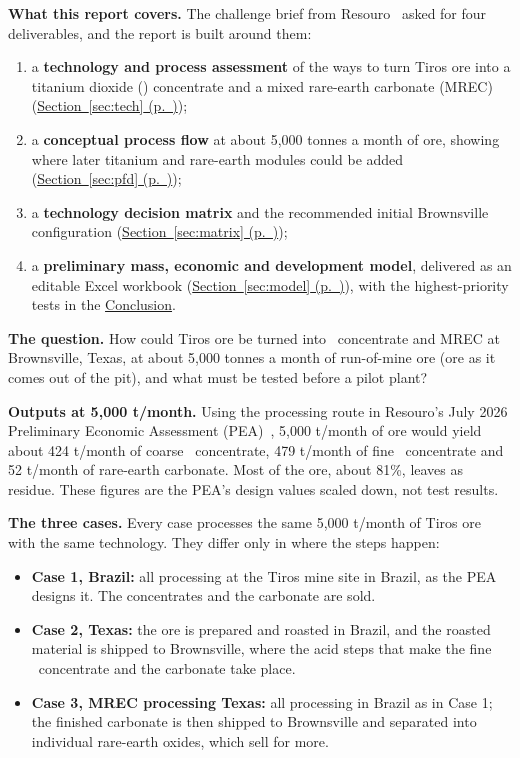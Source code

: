 \documentclass[11pt,letterpaper]{article}
\newcommand{\tio}{\ce{TiO2}}
\newcommand{\sref}[1]{\hyperref[#1]{Section~\ref*{#1} (p.~\pageref*{#1})}}
\begin{document}
\textbf{What this report covers.} The challenge brief from Resouro~\cite{brief} asked for four deliverables, and the report is built around them:
\begin{enumerate}[itemsep=0pt]
\item a \textbf{technology and process assessment} of the ways to turn Tiros ore into a titanium dioxide (\tio) concentrate and a mixed rare-earth carbonate (MREC) (\sref{sec:tech});
\item a \textbf{conceptual process flow} at about 5,000 tonnes a month of ore, showing where later titanium and rare-earth modules could be added (\sref{sec:pfd});
\item a \textbf{technology decision matrix} and the recommended initial Brownsville configuration (\sref{sec:matrix});
\item a \textbf{preliminary mass, economic and development model}, delivered as an editable Excel workbook (\sref{sec:model}), with the highest-priority tests in the \hyperref[sec:conclusion]{Conclusion}.
\end{enumerate}

\textbf{The question.} How could Tiros ore be turned into \tio\ concentrate and MREC at Brownsville, Texas, at about 5,000 tonnes a month of run-of-mine ore (ore as it comes out of the pit), and what must be tested before a pilot plant?

\textbf{Outputs at 5,000 t/month.} Using the processing route in Resouro's July 2026 Preliminary Economic Assessment (PEA)~\cite{pea}, 5,000 t/month of ore would yield about 424 t/month of coarse \tio\ concentrate, 479 t/month of fine \tio\ concentrate and 52 t/month of rare-earth carbonate. Most of the ore, about 81\%, leaves as residue. These figures are the PEA's design values scaled down, not test results.

\textbf{The three cases.} Every case processes the same 5,000 t/month of Tiros ore with the same technology. They differ only in where the steps happen:
\begin{itemize}
\item \textbf{Case 1, Brazil:} all processing at the Tiros mine site in Brazil, as the PEA designs it. The concentrates and the carbonate are sold.
\item \textbf{Case 2, Texas:} the ore is prepared and roasted in Brazil, and the roasted material is shipped to Brownsville, where the acid steps that make the fine \tio\ concentrate and the carbonate take place.
\item \textbf{Case 3, MREC processing Texas:} all processing in Brazil as in Case 1; the finished carbonate is then shipped to Brownsville and separated into individual rare-earth oxides, which sell for more.
\end{itemize}
\end{document}
